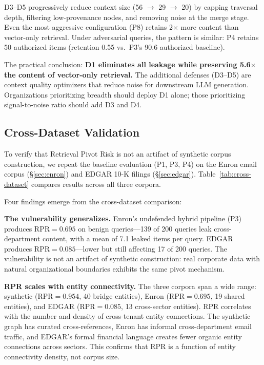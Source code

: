 \documentclass[letterpaper,twocolumn,10pt]{article}
\begin{document}
D3--D5 progressively reduce context size (56 $\to$ 29 $\to$ 20) by
capping traversal depth, filtering low-provenance nodes, and removing
noise at the merge stage. Even the most aggressive configuration (P8)
retains 2$\times$ more content than vector-only retrieval. Under
adversarial queries, the pattern is similar: P4 retains 50 authorized
items (retention 0.55 vs.\ P3's 90.6 authorized baseline).

The practical conclusion: \textbf{D1 eliminates all leakage while
preserving 5.6$\times$ the content of vector-only retrieval.} The
additional defenses (D3--D5) are context quality optimizers that reduce
noise for downstream LLM generation. Organizations prioritizing breadth
should deploy D1 alone; those prioritizing signal-to-noise ratio should
add D3 and D4.

\subsection{Cross-Dataset Validation}
\label{sec:cross-dataset}

To verify that Retrieval Pivot Risk is not an artifact of synthetic
corpus construction, we repeat the baseline evaluation (P1, P3, P4)
on the Enron email corpus (\S\ref{sec:enron}) and EDGAR 10-K filings
(\S\ref{sec:edgar}). Table~\ref{tab:cross-dataset} compares results
across all three corpora.



Four findings emerge from the cross-dataset comparison:

\textbf{The vulnerability generalizes.} Enron's undefended hybrid
pipeline (P3) produces $\text{RPR} = 0.695$ on benign queries---139
of 200 queries leak cross-department content, with a mean of 7.1
leaked items per query. EDGAR produces $\text{RPR} = 0.085$---lower
but still affecting 17 of 200 queries. The vulnerability is not an
artifact of synthetic construction: real corporate data with natural
organizational boundaries exhibits the same pivot mechanism.

\textbf{RPR scales with entity connectivity.} The three corpora span
a wide range: synthetic ($\text{RPR} = 0.954$, 40 bridge entities),
Enron ($\text{RPR} = 0.695$, 19 shared entities), and EDGAR
($\text{RPR} = 0.085$, 13 cross-sector entities). RPR correlates
with the number and density of cross-tenant entity connections. The
synthetic graph has curated cross-references, Enron has informal
cross-department email traffic, and EDGAR's formal financial language
creates fewer organic entity connections across sectors. This confirms
that RPR is a function of entity connectivity density, not corpus size.
\end{document}
